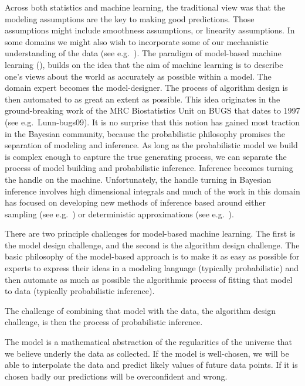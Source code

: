 \documentclass[a4paperpaper,]{article}
\begin{document}
Across both statistics and machine learning, the traditional view was
that the modeling assumptions are the key to making good predictions.
Those assumptions might include smoothness assumptions, or linearity
assumptions. In some domains we might also wish to incorporate some of
our mechanistic understanding of the data (see
e.g.~\citet{Alvarez:llfm13}). The paradigm of model-based machine
learning (\citet{Winn:mbml19}), builds on the idea that the aim of
machine learning is to describe one's views about the world as
accurately as possible within a model. The domain expert becomes the
model-designer. The process of algorithm design is then automated to as
great an extent as possible. This idea originates in the ground-breaking
work of the MRC Biostatistics Unit on BUGS that dates to 1997 (see
e.g.~Lunn-bugs09). It is no surprise that this notion has gained most
traction in the Bayesian community, because the probabilistic philosophy
promises the separation of modeling and inference. As long as the
probabilistic model we build is complex enough to capture the true
generating process, we can separate the process of model building and
probabilistic inference. Inference becomes turning the handle on the
machine. Unfortunately, the handle turning in Bayesian inference
involves high dimensional integrals and much of the work in this domain
has focused on developing new methods of inference based around either
sampling (see e.g.~\citet{Carpenter-stan17}) or deterministic
approximations (see e.g.~\citet{Tran-edward16}).

There are two principle challenges for model-based machine learning. The
first is the model design challenge, and the second is the algorithm
design challenge. The basic philosophy of the model-based approach is to
make it as easy as possible for experts to express their ideas in a
modeling language (typically probabilistic) and then automate as much as
possible the algorithmic process of fitting that model to data
(typically probabilistic inference).

The challenge of combining that model with the data, the algorithm
design challenge, is then the process of probabilistic inference.

The model is a mathematical abstraction of the regularities of the
universe that we believe underly the data as collected. If the model is
well-chosen, we will be able to interpolate the data and predict likely
values of future data points. If it is chosen badly our predictions will
be overconfident and wrong.
\end{document}
